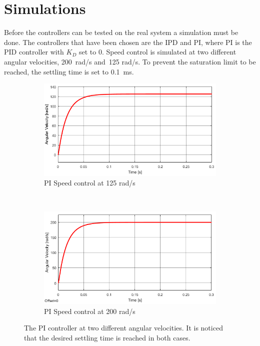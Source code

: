 \section{Simulations}
Before the controllers can be tested on the real system a simulation must be done. The controllers that have been chosen are the IPD and PI, where PI is the PID controller with $K_D$ set to 0. Speed control is simulated at two different angular velocities, 200~rad/s and~125 rad/s. To prevent the saturation limit to be reached, the settling time is set to 0.1~ms.
\begin{figure}[h!]
	\centering
	\begin{subfigure}[b]{0.45\textwidth}
		\includegraphics[width=\textwidth]{graphics/PI_single125}
		\caption{PI Speed control at 125 rad/s}
		\label{fig:pisingle125}
	\end{subfigure}
	~ %
	\begin{subfigure}[b]{0.45\textwidth}
		\includegraphics[width=\textwidth]{graphics/PI_single200}
		\caption{PI Speed control at 200 rad/s}
		\label{fig:pisingle200}
	\end{subfigure}
	\caption{The PI controller at two different angular velocities. It is noticed that the desired settling time is reached in both cases.}\label{fig:pisingle}
\end{figure}






